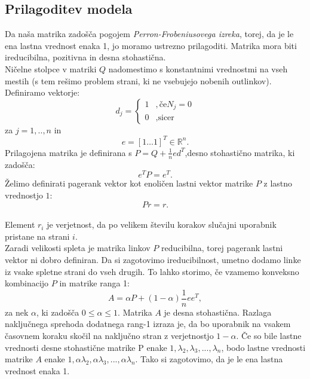 \documentclass[a4paper]{article}
\begin{document}
\subsection{Prilagoditev modela} Da naša matrika zadošča pogojem \textit{Perron-Frobeniusovega izreka}, torej, da je le ena lastna vrednost enaka 1, jo moramo ustrezno prilagoditi. Matrika mora biti ireducibilna, pozitivna in desna stohastična.\\
 Ničelne stolpce v matriki $Q$ nadomestimo s konstantnimi vrednostmi na vseh mestih (s tem rešimo problem strani, ki ne vsebujejo nobenih outlinkov). 
\\Definiramo vektorje: \\
\[
d_j = 
\left \{
	\begin{array}{ll}
		1  &, \mbox{če} N_j = 0 \\
		0 &, \mbox{sicer} 
	\end{array}
\right. \]
za $j = 1, .., n$ in
$$e = [1 … 1] ^T \in \mathbb{R}^n.$$
Prilagojena matrika je definirana s $ P = Q + \frac{1}{n}ed^T$,desno stohastično matrika, ki zadošča:
$$e^TP = e^T.$$
Želimo definirati pagerank vektor kot enoličen lastni vektor matrike $P$ z lastno vrednostjo $1$:
$$Pr=r.$$\\
Element $r_i$ je verjetnost, da po velikem številu korakov slučajni uporabnik pristane na strani $i$.\\
Zaradi velikosti spleta je matrika linkov $P$ reducibilna, torej pagerank lastni vektor ni dobro definiran. Da si zagotovimo ireducibilnost, umetno dodamo linke iz vsake spletne strani do vseh drugih. To lahko storimo, če vzamemo konveksno kombinacijo $P$ in matrike ranga 1:
$$A=\alpha P + (1-\alpha)\frac{1}{n}ee^T,$$
za nek $\alpha$, ki zadošča $0 \leq \alpha \leq 1$. Matrika $A$ je desna stohastična. Razlaga naključnega sprehoda dodatnega rang-1 izraza je, da bo uporabnik na vsakem časovnem koraku skočil na naključno stran z verjetnostjo $1- \alpha$. Če so bile lastne vrednosti desne stohastične matrike P enake $1, \lambda_2, \lambda_3, ... , \lambda_n$, bodo lastne vrednosti matrike $A$ enake $1, \alpha \lambda_2, \alpha \lambda_3, ... , \alpha \lambda_n$. Tako si zagotovimo, da je le ena lastna vrednost enaka 1.
\end{document}
